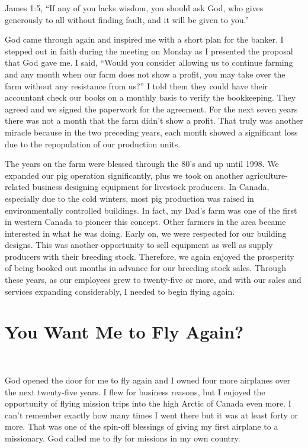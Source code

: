 \documentclass[twoside, 12pt]{book}
\begin{document}
James 1:5, “If any of you lacks wisdom, you should ask God, who gives generously to all without finding fault, and it will be given to you.” 

God came through again and inspired me with a short plan for the banker. I stepped out in faith during the meeting on Monday as I presented the proposal that God gave me. I said, “Would you consider allowing us to continue farming and any month when our farm does not show a profit, you may take over the farm without any resistance from us?” I told them they could have their accountant check our books on a monthly basis to verify the bookkeeping. They agreed and we signed the paperwork for the agreement. For the next seven years there was not a month that the farm didn't show a profit. That truly was another miracle because in the two preceding years, each month showed a significant loss due to the repopulation of our production units.

The years on the farm were blessed through the 80's and up until 1998. We expanded our pig operation significantly, plus we took on another agriculture-related business designing equipment for livestock producers. In Canada, especially due to the cold winters, most pig production was raised in environmentally controlled buildings. In fact, my Dad's farm was one of the first in western Canada to pioneer this concept. Other farmers in the area became interested in what he was doing. Early on, we were respected for our building designs. This was another opportunity to sell equipment as well as supply producers with their breeding stock. Therefore, we again enjoyed the prosperity of being booked out months in advance for our breeding stock sales. Through these years, as our employees grew to twenty-five or more, and with our sales and services expanding considerably, I needed to begin flying again.



\section{You Want Me to Fly Again?}
\

God opened the door for me to fly again and I owned four more airplanes over the next twenty-five years. I flew for business reasons, but I enjoyed the opportunity of flying mission trips into the high Arctic of Canada even more. I can't remember exactly how many times I went there but it was at least forty or more. That was one of the spin-off blessings of giving my first airplane to a missionary. God called me to fly for missions in my own country. 
\end{document}
